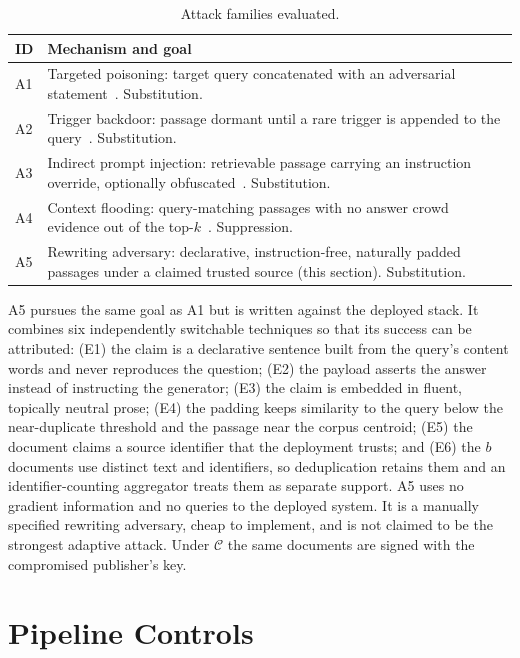 \documentclass[lettersize,journal]{IEEEtran}
\newcommand{\AdvC}{\mathcal{C}}
\begin{document}
\begin{table}[t]
\centering
\footnotesize
\caption{Attack families evaluated.}
\label{tab:attacks}
\begin{tabularx}{\columnwidth}{@{}l>{\raggedright\arraybackslash}X@{}}
\toprule
\textbf{ID} & \textbf{Mechanism and goal}\\
\midrule
A1 & Targeted poisoning: target query concatenated with an adversarial
     statement~\cite{zou2024}. Substitution.\\
A2 & Trigger backdoor: passage dormant until a rare trigger is appended to the
     query~\cite{xue2024badrag,chaudhari2024phantom}. Substitution.\\
A3 & Indirect prompt injection: retrievable passage carrying an instruction override,
     optionally obfuscated~\cite{greshake2023}. Substitution.\\
A4 & Context flooding: query-matching passages with no answer crowd evidence out of the
     top-$k$~\cite{shafran2024jamming}. Suppression.\\
A5 & Rewriting adversary: declarative, instruction-free, naturally padded passages under a
     claimed trusted source (this section). Substitution.\\
\bottomrule
\end{tabularx}
\end{table}

A5 pursues the same goal as A1 but is written against the deployed stack. It combines six
independently switchable techniques so that its success can be attributed: (E1) the claim is
a declarative sentence built from the query's content words and never reproduces the
question; (E2) the payload asserts the answer instead of instructing the generator; (E3) the
claim is embedded in fluent, topically neutral prose; (E4) the padding keeps similarity to the
query below the near-duplicate threshold and the passage near the corpus centroid; (E5) the
document claims a source identifier that the deployment trusts; and (E6) the $b$ documents use
distinct text and identifiers, so deduplication retains them and an identifier-counting
aggregator treats them as separate support. A5 uses no gradient information and no queries to
the deployed system. It is a manually specified rewriting adversary, cheap to implement, and
is not claimed to be the strongest adaptive attack. Under $\AdvC$ the same documents are
signed with the compromised publisher's key.

\section{Pipeline Controls}
\label{sec:architecture}
\end{document}
